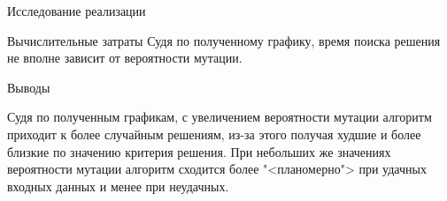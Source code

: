 \documentclass[a4paper,12pt,titlepage,final]{article}
\begin{document}
\begin{section}{Исследование реализации}
\begin{subsection}{Вычислительные затраты}
    Судя по полученному графику, время поиска решения не вполне зависит от вероятности мутации.
    \end{subsection}
\end{section}

\begin{section}{Выводы}

    Судя по полученным графикам, с увеличением вероятности мутации алгоритм приходит к более случайным решениям, из-за этого получая худшие и более близкие по значению критерия решения. При небольших же значениях вероятности мутации алгоритм сходится более "<планомерно"> при удачных входных данных и менее при неудачных.
    
\end{section}
\end{document}
